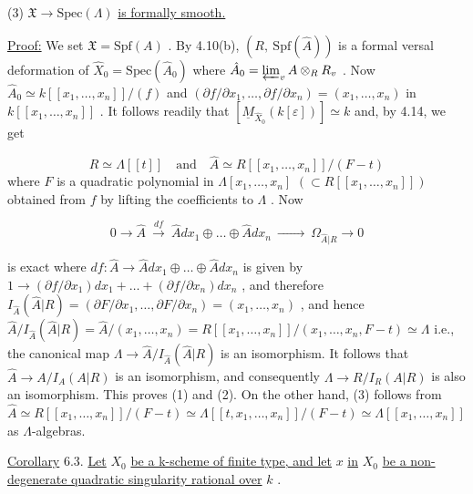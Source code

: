 (3)  $\mathfrak{X} \rightarrow \mathrm{Spec}(\Lambda)$  \underline{is formally smooth.}

\underline{Proof:}  We set  $\mathfrak{X} = \mathrm{Spf}(A)$  . By 4.10(b),  $(R,\ \mathrm{Spf}(\hat{A}))$  is a formal versal deformation of  $\hat{X}_0 = \mathrm{Spec}(\hat{A}_0)$  where  $\hat{A}_0 = \varprojlim_{v} A \otimes_R R_v$  . Now  $\hat{A}_0 \simeq k[[x_1,\dots,x_n]]/(f)$  and  $(\partial f/\partial x_1,\dots,\partial f/\partial x_n) = (x_1,\dots,x_n)$  in $k[[x_1,\dots,x_n]]$  . It follows readily that  $[\underline{M}_{\hat{X}_0}(k[\varepsilon])] \simeq k$  and, by 4.14, we get

\begin{equation*}
R \simeq \Lambda[[t]] \quad\text{and}\quad \hat{A} \simeq R[[x_1,\dots,x_n]]/(F - t)
\end{equation*}
where  $F$  is a quadratic polynomial in  $\Lambda[x_1,\dots,x_n]$  $(\subset R[[x_1,\dots,x_n]])$ obtained from  $f$  by lifting the coefficients to  $\Lambda$  . Now

\begin{equation*}
0 \rightarrow \hat{A} \ \overset{df}{\longrightarrow}\ \hat{A}dx_1 \oplus \dots \oplus \hat{A}dx_n \ \xrightarrow{\hspace{3em}}\ \Omega_{\hat{A}|R} \rightarrow 0 
\end{equation*}


 is exact where  $df : \hat{A} \rightarrow \hat{A}dx_1 \oplus \dots \oplus \hat{A}dx_n$  is given by $1 \rightarrow (\partial f/\partial x_1)dx_1 + \dots + (\partial f/\partial x_n)dx_n$  , and therefore $I_{\hat{A}}(\hat{A}|R) = (\partial F/\partial x_1,\dots,\partial F/\partial x_n) = (x_1,\dots,x_n)$  , and hence $\hat{A}/I_{\hat{A}}(\hat{A}|R) = \hat{A}/(x_1,\dots,x_n) = R[[x_1,\dots,x_n]]/(x_1,\dots,x_n,F - t) \simeq \Lambda$ i.e., the canonical map  $\Lambda \rightarrow \hat{A}/I_{\hat{A}}(\hat{A}|R)$  is an isomorphism. It follows that $\hat{A} \rightarrow A/I_A(A|R)$  is an isomorphism, and consequently  $\Lambda \rightarrow R/I_R(A|R)$  is also an isomorphism. This proves (1) and (2). On the other hand, (3) follows from $\hat{A} \simeq R[[x_1,\dots,x_n]]/(F - t) \simeq \Lambda[[t,x_1,\dots,x_n]]/(F - t) \simeq \Lambda[[x_1,\dots,x_n]]$   as $\Lambda$-algebras.

\underline{Corollary} 6.3.  \underline{Let}  $X_0$  \underline{be a k-scheme of finite type, and let}  $x$  \underline{in}  $X_0$  \underline{be a non-degenerate quadratic singularity rational over}  $k$  .

